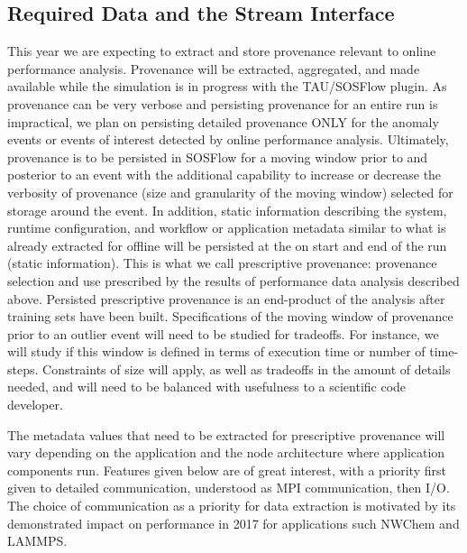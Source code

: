 \subsection{Required Data and the Stream Interface}
\label{subsection:features}
This year we are expecting to extract and store provenance relevant to online performance analysis.  Provenance will be extracted, aggregated, and made available while the simulation is in progress with the TAU/SOSFlow plugin.  As provenance can be very verbose and persisting provenance for an entire run is impractical, we plan on persisting detailed provenance ONLY for the anomaly events or events of interest detected by online performance analysis.  Ultimately, provenance is to be persisted in SOSFlow for a moving window prior to and posterior to an event with the additional capability to increase or decrease the verbosity of provenance (size and granularity of the moving window) selected for storage around the event.  In addition, static information describing the system, runtime configuration, and  workflow or application metadata similar to what is already extracted for offline will be persisted at the on start and end of the run (static information).  This is what we call prescriptive provenance: provenance selection and use prescribed by the results of performance data analysis described above.  Persisted prescriptive provenance is an end-product of the analysis after training sets have been built.
Specifications of the moving window of provenance prior to an outlier event will need to be studied for tradeoffs.  For instance, we will study if this window is defined in terms of execution time or number of time-steps.  Constraints of size will apply, as well as tradeoffs in the amount of details needed, and will need to be balanced with usefulness to a scientific code developer.

The metadata values that need to be extracted for prescriptive provenance will vary depending on the application and the node architecture where application components run.  Features given below are of great interest, with a priority first given to detailed communication, understood as MPI communication, then I/O.  The choice of communication as a priority for data extraction is motivated by its demonstrated impact on performance in 2017 for applications such NWChem and LAMMPS. 



